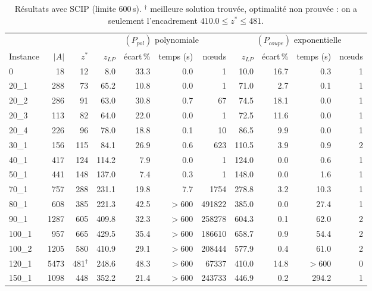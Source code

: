 \documentclass[11pt]{article}
\begin{document}
\begin{table}[h]
\centering\footnotesize
\setlength{\tabcolsep}{4.5pt}
\begin{tabular}{lrr|rrrr|rrrr}
\toprule
& & & \multicolumn{4}{c|}{$(P_{pol})$ polynomiale} & \multicolumn{4}{c}{$(P_{coupe})$ exponentielle}\\
Instance & $|A|$ & $z^*$ & $z_{LP}$ & écart\,\% & temps (s) & nœuds & $z_{LP}$ & écart\,\% & temps (s) & nœuds\\
\midrule
0      &   18 &  12 &   8.0 & 33.3 &   0.0 &      1 &  10.0 & 16.7 &   0.3 & 1\\
20\_1  &  288 &  73 &  65.2 & 10.8 &   0.0 &      1 &  71.0 &  2.7 &   0.1 & 1\\
20\_2  &  286 &  91 &  63.0 & 30.8 &   0.7 &     67 &  74.5 & 18.1 &   0.0 & 1\\
20\_3  &  113 &  82 &  64.0 & 22.0 &   0.0 &      1 &  72.5 & 11.6 &   0.0 & 1\\
20\_4  &  226 &  96 &  78.0 & 18.8 &   0.1 &     10 &  86.5 &  9.9 &   0.0 & 1\\
30\_1  &  156 & 115 &  84.1 & 26.9 &   0.6 &    623 & 110.5 &  3.9 &   0.9 & 2\\
40\_1  &  417 & 124 & 114.2 &  7.9 &   0.0 &      1 & 124.0 &  0.0 &   0.6 & 1\\
50\_1  &  441 & 148 & 137.0 &  7.4 &   0.3 &      1 & 148.0 &  0.0 &   1.6 & 1\\
70\_1  &  757 & 288 & 231.1 & 19.8 &   7.7 &   1754 & 278.8 &  3.2 &  10.3 & 1\\
80\_1  &  608 & 385 & 221.3 & 42.5 & $>$600 & 491822 & 385.0 &  0.0 &  27.4 & 1\\
90\_1  & 1287 & 605 & 409.8 & 32.3 & $>$600 & 258278 & 604.3 &  0.1 &  62.0 & 2\\
100\_1 &  957 & 665 & 429.5 & 35.4 & $>$600 & 186610 & 658.7 &  0.9 &  54.4 & 2\\
100\_2 & 1205 & 580 & 410.9 & 29.1 & $>$600 & 208444 & 577.9 &  0.4 &  61.0 & 2\\
120\_1 & 5473 & 481$^\dagger$ & 248.6 & 48.3 & $>$600 & 67337 & 410.0 & 14.8 & $>$600 & 0\\
150\_1 & 1098 & 448 & 352.2 & 21.4 & $>$600 & 243733 & 446.9 &  0.2 & 294.2 & 1\\
\bottomrule
\end{tabular}
\caption{Résultats avec SCIP (limite 600\,s). $^\dagger$ meilleure solution trouvée,
optimalité non prouvée : on a seulement l'encadrement $410.0\le z^*\le 481$.}
\label{tab:res}
\end{table}
\end{document}
